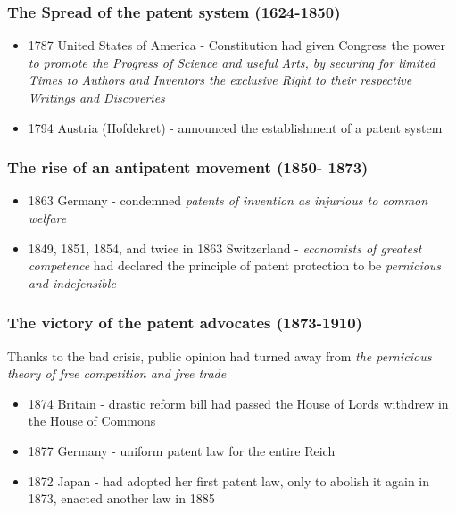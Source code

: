 \begin{frame}
\frametitle{The Spread of the patent system (1624-1850)}
\begin{itemize}
	\item 1787 United States of America - Constitution had given Congress the power \textit{to promote the Progress of Science and useful Arts, by securing for limited Times to Authors and Inventors the exclusive Right to their respective Writings and Discoveries}
	\item 1794 Austria (Hofdekret) - announced the establishment of a patent system
\end{itemize}
\end{frame}

\begin{frame}
\frametitle{The rise of an antipatent movement (1850- 1873)}
\begin{itemize}
	\item 1863 Germany - condemned \textit{patents of invention as injurious to common welfare}
	\item 1849, 1851, 1854, and twice in 1863 Switzerland - \textit{economists of greatest competence} had declared the principle of patent protection to be \textit{pernicious and indefensible}
\end{itemize}
\end{frame}

\begin{frame}
\frametitle{The victory of the patent advocates (1873-1910)}
Thanks to the bad crisis, public opinion had turned away from \textit{the pernicious theory of free competition and free trade}
\begin{itemize}
	\item 1874 Britain - drastic reform bill had passed the House of Lords withdrew in the House of Commons
	\item 1877 Germany - uniform patent law for the entire Reich
    \item 1872 Japan - had adopted her first patent law, only to abolish it again in 1873, enacted another law in 1885
\end{itemize}
\end{frame}


